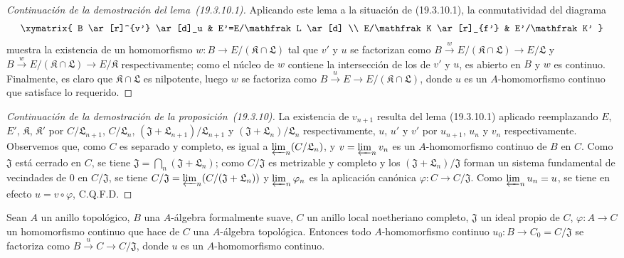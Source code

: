 \begin{proof}[Continuación de la demostración del lema~{\rm(19.3.10.1)}]
Aplicando este lema a la situación de (19.3.10.1), la conmutatividad del
diagrama
\[
\xymatrix{
  B \ar[r]^{v'} \ar[d]_u & E'=E/\mathfrak L \ar[d] \\
  E/\mathfrak K \ar[r]_{f'} & E'/\mathfrak K'
}
\]
muestra la existencia de un homomorfismo
$w:B\to E/(\mathfrak K\cap\mathfrak L)$ tal que $v'$ y $u$ se
factorizan como
$B\xrightarrow{w}E/(\mathfrak K\cap\mathfrak L)\to E/\mathfrak L$
y
$B\xrightarrow{w}E/(\mathfrak K\cap\mathfrak L)\to E/\mathfrak K$
respectivamente; como el núcleo de $w$ contiene la intersección de los de
$v'$ y $u$, es abierto en $B$ y $w$ es continuo. Finalmente, es claro
que $\mathfrak K\cap\mathfrak L$ es nilpotente, luego $w$ se factoriza como
$B\xrightarrow{u}E\to E/(\mathfrak K\cap\mathfrak L)$, donde $u$ es
un $A$-homomorfismo continuo que satisface lo requerido.
\end{proof}

\begin{proof}[Continuación de la demostración de la proposición~{\rm(19.3.10)}]
La existencia de $v_{n+1}$ resulta del lema (19.3.10.1) aplicado reemplazando
$E$, $E'$, $\mathfrak K$, $\mathfrak K'$ por
$C/\mathfrak L_{n+1}$, $C/\mathfrak L_n$,
$(\mathfrak J+\mathfrak L_{n+1})/\mathfrak L_{n+1}$ y
$(\mathfrak J+\mathfrak L_n)/\mathfrak L_n$ respectivamente, $u$, $u'$
y $v'$ por $u_{n+1}$, $u_n$ y $v_n$ respectivamente. Observemos que, como $C$
es separado y completo, es igual a $\varprojlim_n(C/\mathfrak L_n)$, y
$v=\varprojlim_n v_n$ es un $A$-homomorfismo continuo de $B$ en $C$.
Como $\mathfrak J$ está cerrado en $C$, se tiene
$\mathfrak J=\bigcap_n(\mathfrak J+\mathfrak L_n)$; como
$C/\mathfrak J$ es metrizable y completo y los
$(\mathfrak J+\mathfrak L_n)/\mathfrak J$ forman un sistema fundamental
de vecindades de $0$ en $C/\mathfrak J$, se tiene
$C/\mathfrak J=\varprojlim_n(C/(\mathfrak J+\mathfrak L_n))$
y $\varprojlim_n\varphi_n$ es la aplicación canónica
$\varphi:C\to C/\mathfrak J$. Como $\varprojlim_n u_n=u$, se tiene en efecto
$u=v\circ\varphi$, C.Q.F.D.
\end{proof}

\begin{corollary}[19.3.11]
\label{0.19.3.11-fr}
Sean $A$ un anillo topológico, $B$ una $A$-álgebra formalmente suave,
$C$ un anillo local noetheriano completo, $\mathfrak J$ un ideal propio de
$C$, $\varphi:A\to C$ un homomorfismo continuo que hace de $C$ una
$A$-álgebra topológica. Entonces todo $A$-homomorfismo continuo
$u_0:B\to C_0=C/\mathfrak J$ se factoriza como
$B\xrightarrow{u}C\to C/\mathfrak J$, donde $u$ es un $A$-homomorfismo
continuo.
\end{corollary}

